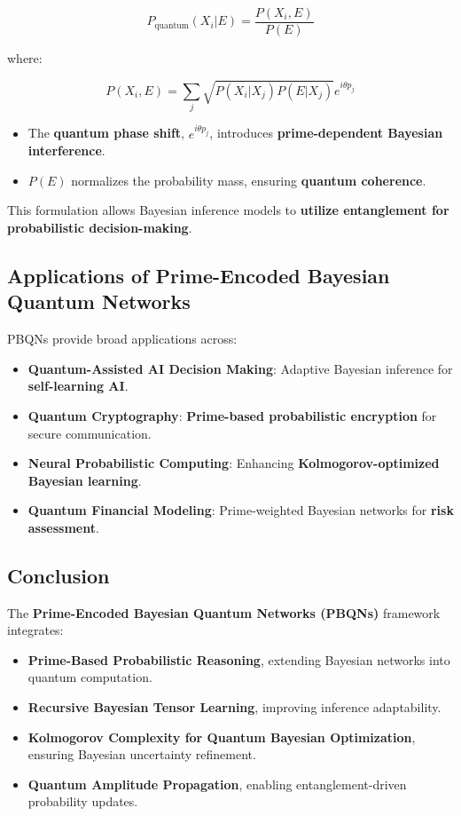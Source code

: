 \documentclass{article}
\theoremstyle{plain}
\theoremstyle{plain}
\theoremstyle{definition}
\theoremstyle{remark}
\begin{document}
\begin{equation}
P_{\text{quantum}} (X_i | E) = \frac{P(X_i, E)}{P(E)}
\end{equation}

where:

\begin{equation}
P(X_i, E) = \sum_{j} \sqrt{P(X_i | X_j) P(E | X_j)} e^{i\theta p_j}
\end{equation}

\begin{itemize}
    \item The \textbf{quantum phase shift}, $e^{i\theta p_j}$, introduces \textbf{prime-dependent Bayesian interference}.
    \item $P(E)$ normalizes the probability mass, ensuring \textbf{quantum coherence}.
\end{itemize}

This formulation allows Bayesian inference models to \textbf{utilize entanglement for probabilistic decision-making}.

\subsection{Applications of Prime-Encoded Bayesian Quantum Networks}

PBQNs provide broad applications across:
\begin{itemize}
    \item \textbf{Quantum-Assisted AI Decision Making}: Adaptive Bayesian inference for \textbf{self-learning AI}.
    \item \textbf{Quantum Cryptography}: \textbf{Prime-based probabilistic encryption} for secure communication.
    \item \textbf{Neural Probabilistic Computing}: Enhancing \textbf{Kolmogorov-optimized Bayesian learning}.
    \item \textbf{Quantum Financial Modeling}: Prime-weighted Bayesian networks for \textbf{risk assessment}.
\end{itemize}

\subsection{Conclusion}

The \textbf{Prime-Encoded Bayesian Quantum Networks (PBQNs)} framework integrates:
\begin{itemize}
    \item \textbf{Prime-Based Probabilistic Reasoning}, extending Bayesian networks into quantum computation.
    \item \textbf{Recursive Bayesian Tensor Learning}, improving inference adaptability.
    \item \textbf{Kolmogorov Complexity for Quantum Bayesian Optimization}, ensuring Bayesian uncertainty refinement.
    \item \textbf{Quantum Amplitude Propagation}, enabling entanglement-driven probability updates.
\end{itemize}
\end{document}
